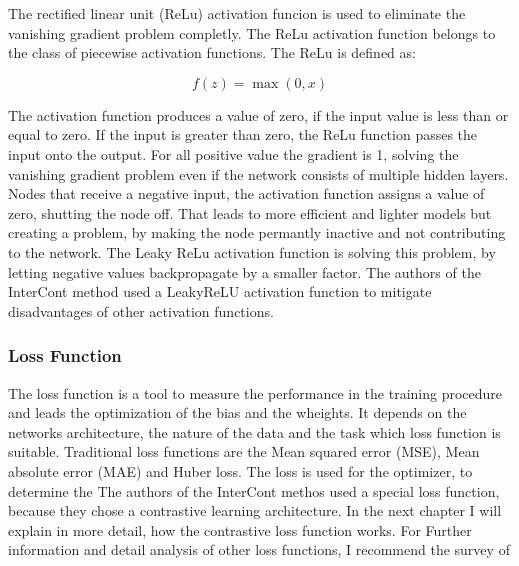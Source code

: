 The rectified linear unit (ReLu) activation funcion is used to eliminate the vanishing gradient problem completly.
The ReLu activation function belongs to the class of piecewise activation functions.
The ReLu is defined as: 

\begin{equation}
    f(z) = \max(0, x)
\end{equation}




The activation function produces a value of zero, if the input value is less than or equal to zero.
If the input is greater than zero, the ReLu function passes the input onto the output.
For all positive value the gradient is 1, solving the vanishing gradient problem even if the network consists of multiple hidden layers.
Nodes that receive a negative input, the activation function  assigns a value of zero, shutting the node off.
That leads to more efficient and lighter models but creating a problem, by making the node permantly inactive and not contributing to the network.
The Leaky ReLu activation function is solving this problem, by letting negative values backpropagate by a smaller factor.
The authors of the InterCont method used a LeakyReLU activation function to mitigate disadvantages of other activation functions.


\subsubsection*{Loss Function}
The loss function is a tool to measure the performance in the training procedure and leads the optimization of the bias and the wheights.
It depends on the networks architecture, the nature of the data and the task which loss function is suitable.
Traditional loss functions are the Mean squared error (MSE), Mean absolute error (MAE) and Huber loss. 
The loss is used for the optimizer, to determine the 
The authors of the InterCont methos used a special loss function, because they chose a contrastive learning architecture.
In the next chapter I will explain in more detail, how the contrastive loss function works.
For Further information and detail analysis of other loss functions, I recommend the survey of \citep{terven2025comprehensive}


